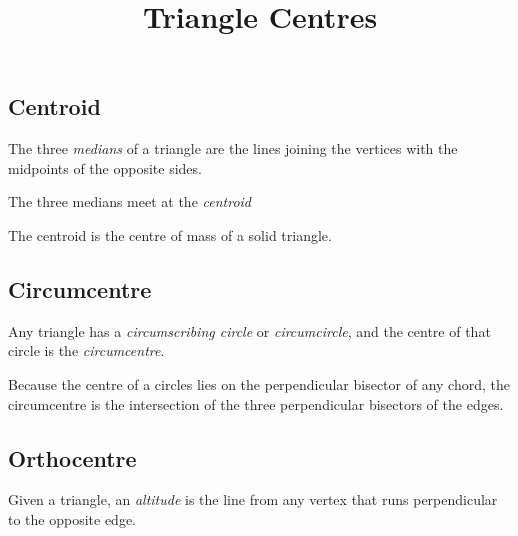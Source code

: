 \documentclass[a4paper, 14pt]{extarticle}
\title{Triangle Centres}
\begin{document}
\maketitle

\subsection*{Centroid}

The three \emph{medians} of a triangle are the lines joining the
vertices with the midpoints of the opposite sides.

The three medians meet at the \emph{centroid}

\begin{center}
\end{center}

The centroid is the centre of mass of a solid triangle.

\subsection*{Circumcentre}

Any triangle has a \emph{circumscribing circle} or
\emph{circumcircle}, and the centre of that circle is the
\emph{circumcentre}.

\begin{center}
\end{center}

Because the centre of a circles lies on the perpendicular bisector of
any chord, the circumcentre is the intersection of the three
perpendicular bisectors of the edges.

\subsection*{Orthocentre}

Given a triangle, an \emph{altitude} is the line from any vertex that
runs perpendicular to the opposite edge.
\end{document}
